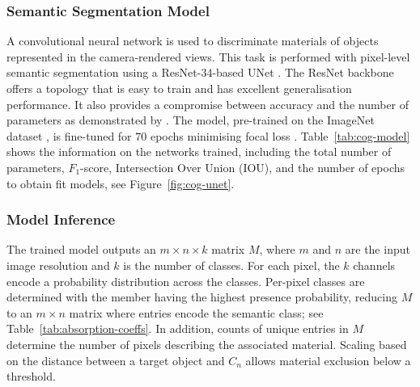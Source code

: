\subsubsection{Semantic Segmentation Model}
A convolutional neural network is used to discriminate materials of objects represented in the camera-rendered views. This task is performed with pixel-level semantic segmentation using a ResNet-34-based UNet \citep{ronneberger2015u}. The ResNet backbone offers a topology that is easy to train and has excellent generalisation performance. It also provides a compromise between accuracy and the number of parameters as demonstrated by \cite{he2016deep}.
The model, pre-trained on the ImageNet dataset \citep{deng2009imagenet}, is fine-tuned for 70 epochs minimising focal loss \citep{lin2017focal}. Table~\ref{tab:cog-model} shows the information on the networks trained, including the total number of parameters, $F_{1}$\hyp{}score, Intersection Over Union (IOU), and the number of epochs to obtain fit models, see Figure~\ref{fig:cog-unet}.



\subsubsection{Model Inference}
The trained model outputs an $m \times n \times k$ matrix $M$, where $m$ and $n$ are the input image resolution and $k$ is the number of classes. For each pixel, the $k$ channels encode a probability distribution across the classes. Per-pixel classes are determined with the member having the highest presence probability, reducing $M$ to an $m \times n$ matrix where entries encode the semantic class; see Table~\ref{tab:absorption-coeffs}. 
In addition, counts of unique entries in $M$ determine the number of pixels describing the associated material. Scaling based on the distance between a target object and $C_n$ allows material exclusion below a threshold.

